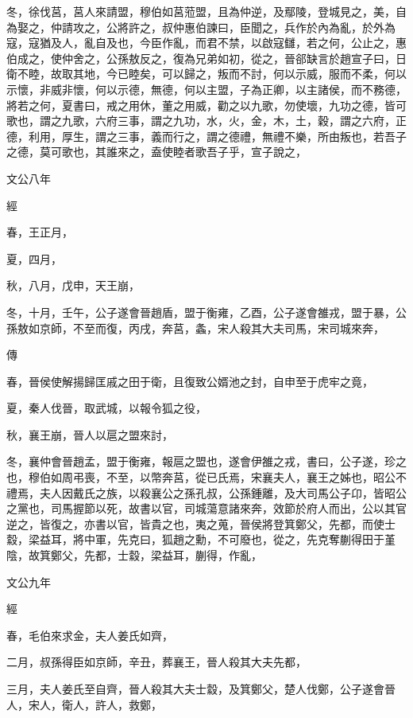 \documentclass{ctexart}
\begin{document}
冬，徐伐莒，莒人來請盟，穆伯如莒蒞盟，且為仲逆，及鄢陵，登城見之，美，自為娶之，仲請攻之，公將許之，叔仲惠伯諫曰，臣聞之，兵作於內為亂，於外為寇，寇猶及人，亂自及也，今臣作亂，而君不禁，以啟寇讎，若之何，公止之，惠伯成之，使仲舍之，公孫敖反之，復為兄弟如初，從之，晉郤缺言於趙宣子曰，日衛不睦，故取其地，今已睦矣，可以歸之，叛而不討，何以示威，服而不柔，何以示懷，非威非懷，何以示德，無德，何以主盟，子為正卿，以主諸侯，而不務德，將若之何，夏書曰，戒之用休，董之用威，勸之以九歌，勿使壞，九功之德，皆可歌也，謂之九歌，六府三事，謂之九功，水，火，金，木，土，穀，謂之六府，正德，利用，厚生，謂之三事，義而行之，謂之德禮，無禮不樂，所由叛也，若吾子之德，莫可歌也，其誰來之，盍使睦者歌吾子乎，宣子說之，





文公八年


經



春，王正月，

夏，四月，

秋，八月，戊申，天王崩，

冬，十月，壬午，公子遂會晉趙盾，盟于衡雍，乙酉，公子遂會雒戎，盟于暴，公孫敖如京師，不至而復，丙戌，奔莒，螽，宋人殺其大夫司馬，宋司城來奔，

傳



春，晉侯使解揚歸匡戚之田于衛，且復致公婿池之封，自申至于虎牢之竟，

夏，秦人伐晉，取武城，以報令狐之役，

秋，襄王崩，晉人以扈之盟來討，

冬，襄仲會晉趙孟，盟于衡雍，報扈之盟也，遂會伊雒之戎，書曰，公子遂，珍之也，穆伯如周弔喪，不至，以幣奔莒，從已氏焉，宋襄夫人，襄王之姊也，昭公不禮焉，夫人因戴氏之族，以殺襄公之孫孔叔，公孫鍾離，及大司馬公子卬，皆昭公之黨也，司馬握節以死，故書以官，司城蕩意諸來奔，效節於府人而出，公以其官逆之，皆復之，亦書以官，皆貴之也，夷之蒐，晉侯將登箕鄭父，先都，而使士縠，梁益耳，將中軍，先克曰，狐趙之勳，不可廢也，從之，先克奪蒯得田于堇陰，故箕鄭父，先都，士縠，梁益耳，蒯得，作亂，





文公九年


經



春，毛伯來求金，夫人姜氏如齊，

二月，叔孫得臣如京師，辛丑，葬襄王，晉人殺其大夫先都，

三月，夫人姜氏至自齊，晉人殺其大夫士縠，及箕鄭父，楚人伐鄭，公子遂會晉人，宋人，衛人，許人，救鄭，
\end{document}
